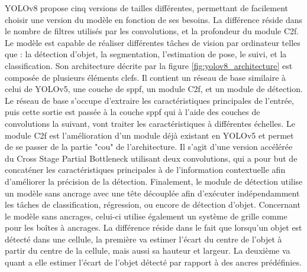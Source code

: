 YOLOv8 propose cinq versions de tailles différentes, permettant de facilement choisir une version du modèle en fonction de ses besoins. La différence réside dans le nombre de filtres utilisés par les convolutions, et la profondeur du module C2f. Le modèle est capable de réaliser différentes tâches de vision par ordinateur telles que : la détection d'objet, la segmentation, l'estimation de pose, le suivi, et la classification. Son architecture décrite par la figure \ref{fig:yolov8_architecture} est composée de plusieurs éléments clefs. Il contient un réseau de base similaire à celui de YOLOv5, une couche de \acrfull{sppf}, un module C2f, et un module de détection. Le réseau de base s'occupe d'extraire les caractéristiques principales de l'entrée, puis cette sortie est passée à la couche \acrshort{sppf} qui à l'aide des couches de convolutions la suivant, vont traiter les caractéristiques à différentes échelles. Le module C2f est l'amélioration d'un module déjà existant en YOLOv5 et permet de se passer de la partie "cou" de l'architecture. Il s'agit d'une version accélérée du Cross Stage Partial Bottleneck utilisant deux convolutions, qui a pour but de concaténer les caractéristiques principales à de l'information contextuelle afin d'améliorer la précision de la détection. Finalement, le module de détection utilise un modèle sans ancrage avec une tête découplée afin d'exécuter indépendamment les tâches de classification, régression, ou encore de détection d'objet. Concernant le modèle sans ancrages, celui-ci utilise également un système de grille comme pour les boîtes à ancrages. La différence réside dans le fait que lorsqu'un objet est détecté dans une cellule, la première va estimer l'écart du centre de l'objet à partir du centre de la cellule, mais aussi sa hauteur et largeur. La deuxième va quant a elle estimer l'écart de l'objet détecté par rapport à des ancres prédéfinies.

